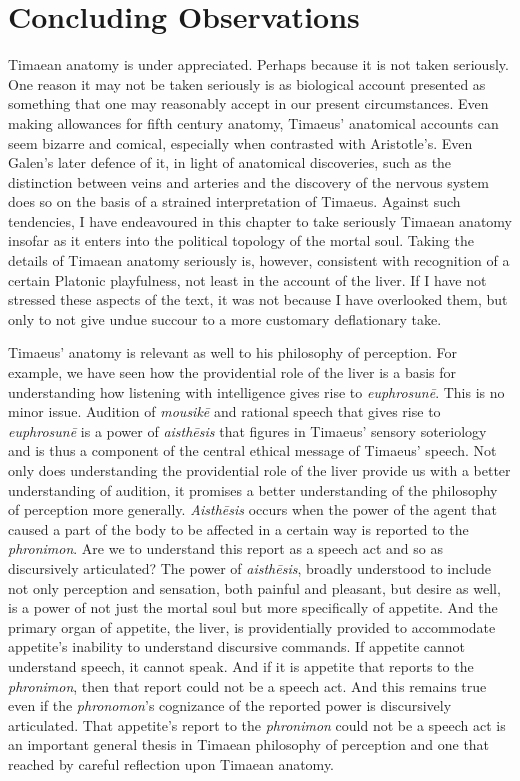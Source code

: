 
\section{Concluding Observations} %
\label{sec:concluding_observations}

Timaean anatomy is under appreciated. Perhaps because it is not taken seriously. One reason it may not be taken seriously is as biological account presented as something that one may reasonably accept in our present circumstances. Even making allowances for fifth century anatomy, Timaeus' anatomical accounts can seem bizarre and comical, especially when contrasted with Aristotle's. Even Galen's later defence of it, in light of anatomical discoveries, such as the distinction between veins and arteries and the discovery of the nervous system does so on the basis of a strained interpretation of Timaeus. Against such tendencies, I have endeavoured in this chapter to take seriously Timaean anatomy insofar as it enters into the political topology of the mortal soul. Taking the details of Timaean anatomy seriously is, however, consistent with recognition of a certain Platonic playfulness, not least in the account of the liver. If I have not stressed these aspects of the text, it was not because I have overlooked them, but only to not give undue succour to a more customary deflationary take.

Timaeus' anatomy is relevant as well to his philosophy of perception. For example, we have seen how the providential role of the liver is a basis for understanding how listening with intelligence gives rise to \emph{euphrosunē}. This is no minor issue. Audition of \emph{mousikē} and rational speech that gives rise to \emph{euphrosunē} is a power of \emph{aisthēsis} that figures in Timaeus' sensory soteriology and is thus a component of the central ethical message of Timaeus' speech. Not only does understanding the providential role of the liver provide us with a better understanding of audition, it promises a better understanding of the philosophy of perception more generally. \emph{Aisthēsis} occurs when the power of the agent that caused a part of the body to be affected in a certain way is reported to the \emph{phronimon}. Are we to understand this report as a speech act and so as discursively articulated? The power of \emph{aisthēsis}, broadly understood to include not only perception and sensation, both painful and pleasant, but desire as well, is a power of not just the mortal soul but more specifically of appetite. And the primary organ of appetite, the liver, is providentially provided to accommodate appetite's inability to understand discursive commands. If appetite cannot understand speech, it cannot speak. And if it is appetite that reports to the \emph{phronimon}, then that report could not be a speech act. And this remains true even if the \emph{phronomon}'s cognizance of the reported power is discursively articulated. That appetite's report to the \emph{phronimon} could not be a speech act is an important general thesis in Timaean philosophy of perception and one that reached by careful reflection upon Timaean anatomy.



